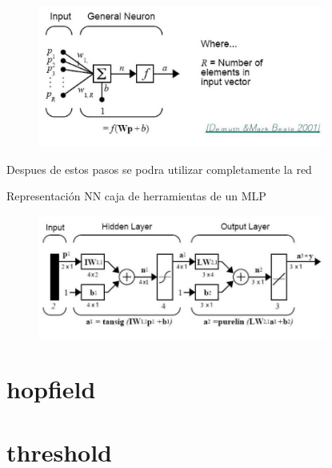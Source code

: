 \documentclass[11pt]{article}
\begin{document}
\begin{figure}[htp]
\centering
\includegraphics[width=9.5cm]{2.jpg}
\label{fig:lion}
\end{figure}


Despues de estos pasos se podra utilizar completamente la red

Representación NN caja de herramientas de un MLP

\begin{figure}[htp]
\centering
\includegraphics[width=9.5cm]{1.jpg}
\label{fig:lion}
\end{figure}

\newpage

\section{hopfield}


\newpage

\section{threshold}

\end{document}
